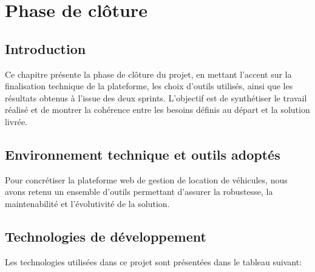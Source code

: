 \chapter{Phase de clôture}
\label{Chapitre_5}
\section{Introduction}
\label{Introduction}
Ce chapitre présente la phase de clôture du projet, en mettant l'accent sur la finalisation
technique de la plateforme, les choix d'outils utilisés, ainsi que les résultats obtenus à l'issue
des deux sprints. L'objectif est de synthétiser le travail réalisé et de montrer la cohérence entre
les besoins définis au départ et la solution livrée.




\section{Environnement technique et outils adoptés}
\label{section5.2}
Pour concrétiser la plateforme web de gestion de location de véhicules, nous avons retenu
un ensemble d'outils permettant d'assurer la robustesse, la maintenabilité et l'évolutivité de
la solution.

\section{Technologies de développement}
Les technologies utilisées dans ce projet sont présentées dans le tableau suivant:


